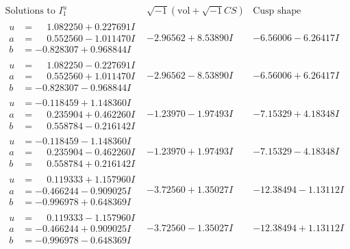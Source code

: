 \documentclass[1p]{elsarticle_modified}
\theoremstyle{definition}
\newcommand{\I}{\sqrt{-1}}
\begin{document}
$$\begin{array}{c|c|c}  
\text{Solutions to }I^u_{1}& \I (\text{vol} + \sqrt{-1}CS) & \text{Cusp shape}\\
 \hline 
\begin{aligned}
u &= \phantom{-}1.082250 + 0.227691 I \\
a &= \phantom{-}0.552560 - 1.011470 I \\
b &= -0.828307 + 0.968844 I\end{aligned}
 & -2.96562 + 8.53890 I & -6.56006 - 6.26417 I \\ \hline\begin{aligned}
u &= \phantom{-}1.082250 - 0.227691 I \\
a &= \phantom{-}0.552560 + 1.011470 I \\
b &= -0.828307 - 0.968844 I\end{aligned}
 & -2.96562 - 8.53890 I & -6.56006 + 6.26417 I \\ \hline\begin{aligned}
u &= -0.118459 + 1.148360 I \\
a &= \phantom{-}0.235904 + 0.462260 I \\
b &= \phantom{-}0.558784 - 0.216142 I\end{aligned}
 & -1.23970 - 1.97493 I & -7.15329 + 4.18348 I \\ \hline\begin{aligned}
u &= -0.118459 - 1.148360 I \\
a &= \phantom{-}0.235904 - 0.462260 I \\
b &= \phantom{-}0.558784 + 0.216142 I\end{aligned}
 & -1.23970 + 1.97493 I & -7.15329 - 4.18348 I \\ \hline\begin{aligned}
u &= \phantom{-}0.119333 + 1.157960 I \\
a &= -0.466244 - 0.909025 I \\
b &= -0.996978 + 0.648369 I\end{aligned}
 & -3.72560 + 1.35027 I & -12.38494 - 1.13112 I \\ \hline\begin{aligned}
u &= \phantom{-}0.119333 - 1.157960 I \\
a &= -0.466244 + 0.909025 I \\
b &= -0.996978 - 0.648369 I\end{aligned}
 & -3.72560 - 1.35027 I & -12.38494 + 1.13112 I \\ \hline\begin{aligned}

\end{aligned}
\end{array}$$
\end{document}
